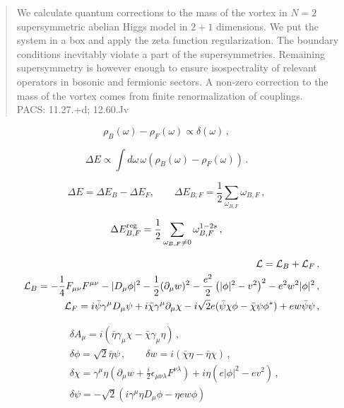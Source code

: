 \documentclass[]{article}
\title{}
\author{}
\begin{document}
\maketitle


\begin{abstract}
	We calculate quantum corrections to the mass of the vortex in $N=2$
	supersymmetric abelian Higgs model in $2+1$ dimensions. We put the system
	in a box and apply the zeta function regularization. The boundary conditions 
	inevitably violate a part of the supersymmetries. Remaining supersymmetry
	is however enough to ensure isospectrality of relevant operators in bosonic
	and fermionic sectors. A non-zero correction to the mass of the vortex
	comes from finite renormalization of couplings.\\
	PACS: 11.27.+d; 12.60.Jv 
\end{abstract}

\begin{equation}
	\rho_B(\omega ) - \rho_F(\omega )\propto \delta (\omega ) \,,
	\label{rrd}
\end{equation}

\begin{equation}
	\Delta E\propto \int d\omega\, \omega (\rho_B(\omega ) - \rho_F(\omega ))
	\,.\label{DEspectdens}
\end{equation}

\begin{equation}
	\Delta E=\Delta E_B - \Delta E_F,\qquad \Delta E_{B,F} = \frac 12
	\sum_{\omega_{B,F}} \omega_{B,F} \,,\label{DEBF}
\end{equation}

\begin{equation}
	\Delta E^{\rm reg}_{B,F}=\frac 12 \sum_{\omega_{B,F}\ne 0} \omega_{B,F}^{1-2s}
	\,,
	\label{DEreg}
\end{equation}

\begin{eqnarray} 
	&&{\cal L}={\cal L}_B+{\cal L}_F \,,\label{LLL}\\
	&&{\cal L}_B=-\frac 14 F_{\mu\nu}F^{\mu\nu} -|D_\mu \phi |^2
	-\frac 12 (\partial_\mu w )^2 
	-\frac{e^2}2 \left( |\phi|^2 -v^2 \right)^2
	-e^2 w^2 |\phi|^2 \,,\label{LB} \\
	&&{\cal L}_F=i\bar\psi \gamma^\mu D_\mu \psi 
	+i\bar\chi \gamma^\mu \partial_\mu \chi
	-i \sqrt{2} e (\bar\psi \chi \phi -\bar\chi\psi \phi^*)
	+ew\bar\psi\psi \,,\label{LF}
\end{eqnarray}

\begin{eqnarray}
	&&\delta A_\mu =i\left( \bar\eta \gamma_\mu \chi -
	\bar\chi\gamma_\mu \eta \right) \,,\nonumber \\
	&&\delta \phi = \sqrt{2} \bar\eta \psi\,,\qquad
	\delta w =i (\bar\chi \eta -\bar \eta \chi ) \,,\nonumber \\
	&&\delta \chi = \gamma^\mu \eta \left( \partial_\mu w +
	\frac i2 \epsilon_{\mu\nu\lambda}F^{\nu\lambda} \right)
	+i\eta (e |\phi |^2 -ev^2 ) \,,\nonumber \\
	&&\delta \psi =-\sqrt{2} \left( i\gamma^\mu \eta D_\mu \phi
	-\eta e w \phi \right) \label{susy}
\end{eqnarray}
\end{document}
